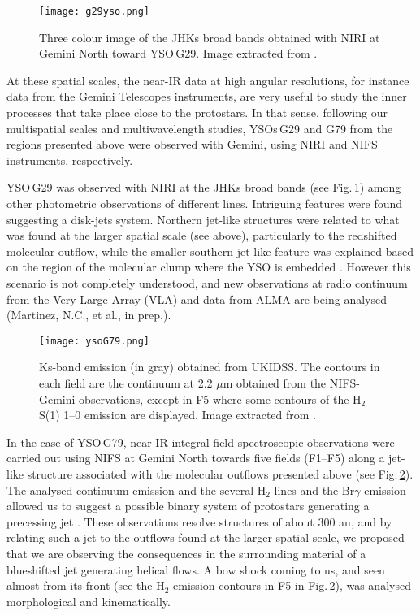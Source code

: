 \documentclass[baaa]{baaa}
\begin{document}
\begin{figure}[h!]
\centering
\texttt{[image: g29yso.png]}
\caption{Three colour image of the JHKs broad bands obtained with NIRI at Gemini North toward YSO\,G29. Image extracted from \citet{areal20}.
}
\label{g29niri}
\end{figure}

At these spatial scales, the near-IR data at high angular resolutions, for instance data from the Gemini Telescopes instruments, are very useful to study the inner processes that take place close to the protostars. In that sense, following our multispatial scales and multiwavelength studies, YSOs\,G29 and G79 from the regions presented above were observed with Gemini, using NIRI and NIFS instruments, respectively.

YSO\,G29 was observed with NIRI at the JHKs broad bands (see Fig.\,\ref{g29niri}) among other photometric observations of different lines. Intriguing features were found suggesting a disk-jets system. Northern jet-like structures were related to what was found at the larger spatial scale (see above), particularly to the redshifted molecular outflow, while the smaller southern jet-like feature was explained based on the region of the molecular clump where the YSO is embedded \citep{areal20}. However this scenario is not completely understood, and new observations at radio continuum from the Very Large Array (VLA) and data from ALMA are being analysed (Martinez, N.C., et al., in prep.). 

\begin{figure}[h]
\centering
\texttt{[image: ysoG79.png]}
\caption{Ks-band emission (in gray) obtained from UKIDSS. The contours in each field are the continuum at 2.2 $\mu$m obtained from the NIFS-Gemini observations, except in F5 where some contours of the H$_{2}$ S(1) 1--0 emission are displayed.  Image extracted from \citet{paron22}.
}
\label{g79nifs}
\end{figure}

In the case of YSO\,G79, near-IR integral field spectroscopic observations were carried out using NIFS at Gemini North towards five fields (F1--F5) along a jet-like structure associated with the molecular outflows presented above (see Fig.\,\ref{g79nifs}). The analysed continuum emission and the several H$_{2}$ lines and the Br$\gamma$ emission allowed us to suggest a possible binary system of protostars generating a precessing jet \citep{paron22}. These observations resolve structures of about 300 au, and by relating such a jet to the outflows found at the larger spatial scale, we proposed that we are observing the consequences in the surrounding material of a blueshifted jet generating helical flows. A bow shock coming to us, and seen almost from its front (see the H$_{2}$ emission contours in F5 in Fig.\,\ref{g79nifs}), was analysed morphological and kinematically.  
\end{document}
